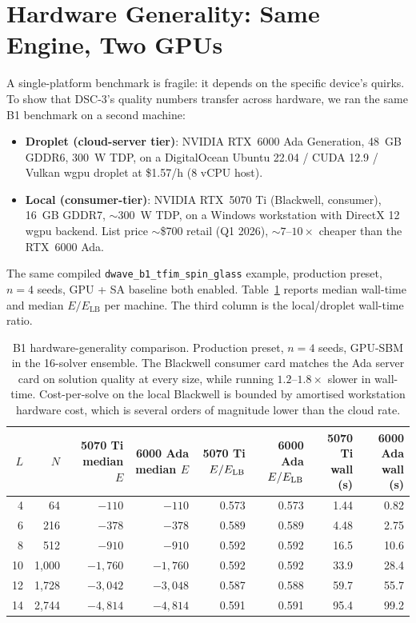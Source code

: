 \documentclass[11pt,a4paper]{article}
\begin{document}
\section{Hardware Generality: Same Engine, Two GPUs}
\label{sec:hardware}

A single-platform benchmark is fragile: it depends on the specific
device's quirks. To show that DSC-3's quality numbers transfer across
hardware, we ran the same B1 benchmark on a second machine:

\begin{itemize}\itemsep0.15em
\item[$\bullet$] \textbf{Droplet (cloud-server tier)}: NVIDIA
  RTX~6000 Ada Generation, 48~GB GDDR6, 300~W TDP, on a DigitalOcean
  Ubuntu 22.04 / CUDA 12.9 / Vulkan wgpu droplet at \$1.57/h
  (8 vCPU host).
\item[$\bullet$] \textbf{Local (consumer-tier)}: NVIDIA RTX~5070 Ti
  (Blackwell, consumer), 16~GB GDDR7, $\sim$300~W TDP, on a Windows
  workstation with DirectX 12 wgpu backend. List price $\sim$\$700
  retail (Q1 2026), $\sim 7$--$10\times$ cheaper than the RTX~6000 Ada.
\end{itemize}

The same compiled \texttt{dwave\_b1\_tfim\_spin\_glass} example,
production preset, $n=4$ seeds, GPU + SA baseline both enabled.
Table~\ref{tab:hardware_compare} reports median wall-time and median
$E/E_{\mathrm{LB}}$ per machine. The third column is the
local/droplet wall-time ratio.

\begin{table}[h]
\centering
\caption{B1 hardware-generality comparison. Production preset, $n=4$
seeds, GPU-SBM in the 16-solver ensemble. The Blackwell consumer card
matches the Ada server card on solution quality at every size, while
running $1.2$--$1.8\times$ slower in wall-time. Cost-per-solve on the
local Blackwell is bounded by amortised workstation hardware cost,
which is several orders of magnitude lower than the cloud rate.}
\label{tab:hardware_compare}
\small
\begin{tabular}{rrrrrrrr}
\toprule
$L$ & $N$ & 5070 Ti median $E$ & 6000 Ada median $E$ & 5070 Ti $E/E_{\rm LB}$ & 6000 Ada $E/E_{\rm LB}$ & 5070 Ti wall (s) & 6000 Ada wall (s) \\
\midrule
4  & 64    & $-110$       & $-110$       & 0.573 & 0.573 & 1.44   & 0.82   \\
6  & 216   & $-378$       & $-378$       & 0.589 & 0.589 & 4.48   & 2.75   \\
8  & 512   & $-910$       & $-910$       & 0.592 & 0.592 & 16.5   & 10.6   \\
10 & 1{,}000 & $-1{,}760$    & $-1{,}760$    & 0.592 & 0.592 & 33.9   & 28.4   \\
12 & 1{,}728 & $-3{,}042$    & $-3{,}048$    & 0.587 & 0.588 & 59.7   & 55.7   \\
14 & 2{,}744 & $-4{,}814$    & $-4{,}814$    & 0.591 & 0.591 & 95.4   & 99.2   \\
\bottomrule
\end{tabular}
\end{table}
\end{document}
